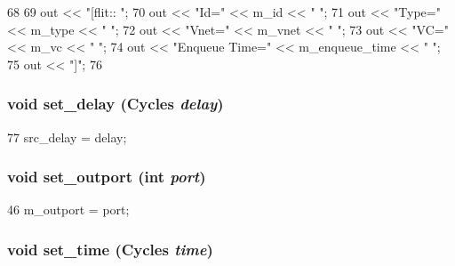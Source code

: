\begin{DoxyCode}
68 {
69     out << "[flit:: ";
70     out << "Id=" << m_id << " ";
71     out << "Type=" << m_type << " ";
72     out << "Vnet=" << m_vnet << " ";
73     out << "VC=" << m_vc << " ";
74     out << "Enqueue Time=" << m_enqueue_time << " ";
75     out << "]";
76 }
\end{DoxyCode}
\hypertarget{classflit__d_ab5c471d239a55ffb064ca98eaabcc022}{
\subsubsection[{set\_\-delay}]{\setlength{\rightskip}{0pt plus 5cm}void set\_\-delay ({\bf Cycles} {\em delay})}}
\label{classflit__d_ab5c471d239a55ffb064ca98eaabcc022}



\begin{DoxyCode}
77 { src_delay = delay; }
\end{DoxyCode}
\hypertarget{classflit__d_aa1d4d1a6b00a00a26d282182257c5897}{
\subsubsection[{set\_\-outport}]{\setlength{\rightskip}{0pt plus 5cm}void set\_\-outport (int {\em port})}}
\label{classflit__d_aa1d4d1a6b00a00a26d282182257c5897}



\begin{DoxyCode}
46 { m_outport = port; }
\end{DoxyCode}
\hypertarget{classflit__d_ae1056dab3fa41e4faf25e82848d0a6a5}{
\subsubsection[{set\_\-time}]{\setlength{\rightskip}{0pt plus 5cm}void set\_\-time ({\bf Cycles} {\em time})}}
\label{classflit__d_ae1056dab3fa41e4faf25e82848d0a6a5}



